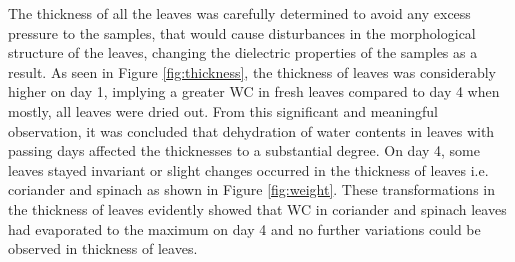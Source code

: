 \documentclass[journal,article,submit,moreauthors,pdftex]{Definitions/mdpi}
\renewcommand{\^}{\hat}  %
\begin{document}
The thickness of all the leaves was carefully determined to avoid any excess pressure to the samples, that would cause disturbances in the morphological structure of the leaves, changing the dielectric properties of the samples as a result. As seen in Figure \ref{fig:thickness}, the thickness of leaves was considerably higher on day 1, implying a greater WC in fresh leaves compared to day 4 when mostly, all leaves were dried out. From this significant and meaningful observation, it was concluded that dehydration of water contents in leaves with passing days affected the thicknesses to a substantial degree. On day 4, some leaves stayed invariant or slight changes occurred in the thickness of leaves i.e. coriander and spinach as shown in Figure \ref{fig:weight}. These transformations in the thickness of leaves evidently showed that WC in coriander and spinach leaves had evaporated to the maximum on day 4 and no further variations could be observed in thickness of leaves.
\end{document}
